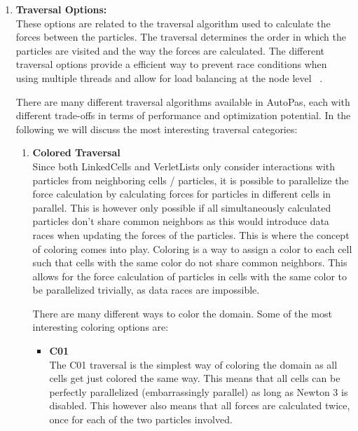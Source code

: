 \begin{enumerate}[label=\textbf{\arabic*.}]
      \item \textbf{Traversal Options:} \\
            These options are related to the traversal algorithm used to calculate the forces between the particles. The traversal determines the order in which the particles are visited and the way the forces are calculated.
            The different traversal options provide a efficient way to prevent race conditions when using multiple threads and allow for load balancing at the node level ~\cite{SECKLER2021101296}.

            There are many different traversal algorithms available in AutoPas, each with different trade-offs in terms of performance and optimization potential. In the following we will discuss the most interesting traversal categories:


            \begin{enumerate}

                  \item \textbf{Colored Traversal} \\
                        Since both LinkedCells and VerletLists only consider interactions with particles from neighboring cells / particles, it is possible to parallelize the force calculation by calculating forces for particles in different cells in parallel. This is however only possible if all simultaneously calculated particles don't share common neighbors as this would introduce data races when updating the forces of the particles. This is where the concept of coloring comes into play. Coloring is a way to assign a color to each cell such that cells with the same color do not share common neighbors. This allows for the force calculation of particles in cells with the same color to be parallelized trivially, as data races are impossible.

                        There are many different ways to color the domain. Some of the most interesting coloring options are:
                        \begin{itemize}
                              \item \textbf{C01} \\
                                    The C01 traversal is the simplest way of coloring the domain as all cells get just colored the same way. This means that all cells can be perfectly parallelized (embarrassingly parallel) as long as Newton 3 is disabled. This however also means that all forces are calculated twice, once for each of the two particles involved.


\end{itemize}
\end{enumerate}
\end{enumerate}
